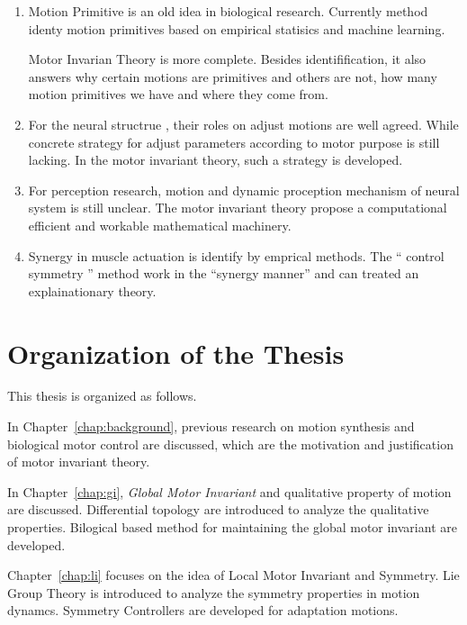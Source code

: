 \begin{enumerate}
\item Motion Primitive is an old idea in biological research. 
Currently method identy motion primitives based on empirical statisics and machine learning.

Motor Invarian Theory is more complete.
Besides identifification, it also answers why certain motions are  primitives and others are not,
how many motion primitives we have and where they come from.


\item For the neural structrue \cpg , their roles on adjust motions are well agreed.
While concrete strategy for adjust \cpg parameters according to motor purpose is still lacking.
In the motor invariant theory,  such a strategy is developed.

\item For perception research, motion and dynamic proception mechanism of neural system is still unclear.
The motor invariant theory propose a computational efficient and workable mathematical machinery.

\item Synergy in muscle actuation is identify by emprical methods. 
The `` control symmetry '' method work in the ``synergy manner''  and can treated an explainationary theory.
\end{enumerate}







\section{Organization of the Thesis}

This thesis is organized as follows.
 
In Chapter~\ref{chap:background}, previous research on motion synthesis and biological motor control are discussed, which are the motivation and justification of motor invariant theory.
 
In Chapter~\ref{chap:gi}, \emph{Global Motor Invariant} and qualitative property of motion are discussed. 
Differential topology are introduced to analyze the qualitative properties.
Bilogical based  method for maintaining the global motor invariant are developed.

Chapter~\ref{chap:li} focuses on the idea of Local Motor Invariant and Symmetry.
Lie Group Theory is  introduced  to analyze the symmetry properties in motion dynamcs.
Symmetry Controllers are developed for adaptation motions.
 


